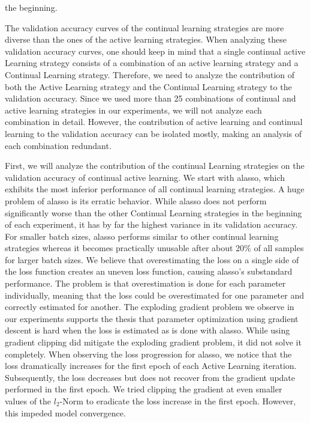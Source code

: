 the beginning. \par
The validation accuracy curves of the continual learning strategies are more diverse than the ones of the active learning strategies. When analyzing these
validation accuracy curves, one should keep in mind that a single continual active Learning strategy consists of a combination of an active learning
strategy and a Continual Learning strategy. Therefore, we need to analyze the contribution of both the Active Learning strategy and the Continual Learning
strategy to the validation accuracy. Since we used more than 25 combinations of continual and active learning strategies in our experiments, we will not
analyze each combination in detail. However, the contribution of active learning and continual learning to the validation
accuracy can be isolated mostly, making an analysis of each combination redundant. \par
First, we will analyze the contribution of the continual Learning strategies on the validation accuracy of continual active learning. We start with \gls{alasso},
which exhibits the most inferior performance of all continual learning strategies. A huge problem of \gls{alasso} is its erratic behavior. While
\gls{alasso} does not perform significantly worse than the other Continual Learning strategies in the beginning of each experiment, it has by far the highest
variance in its validation accuracy. For smaller batch sizes, \gls{alasso} performs similar to other continual learning strategies whereas it becomes practically
unusable after about 20\% of all samples for larger batch sizes. We believe that overestimating the loss on a single side of the loss function creates an uneven loss function,
causing \gls{alasso}'s substandard performance. The problem is that overestimation is done for each parameter individually, meaning that the loss could be
overestimated for one parameter and correctly estimated for another. The exploding gradient problem we observe in our experiments supports the thesis that
parameter optimization using gradient descent is hard when the loss is estimated as is done with \gls{alasso}.  While using gradient clipping did mitigate the
exploding gradient problem, it did not solve it completely. When observing the loss progression for \gls{alasso}, we notice that the loss dramatically increases
for the first epoch of each Active Learning iteration. Subsequently, the loss decreases but does not recover from the gradient update performed in the first epoch.
We tried clipping the gradient at even smaller values of the $l_2$-Norm to eradicate the loss increase in the first epoch. However, this impeded model convergence. \par
